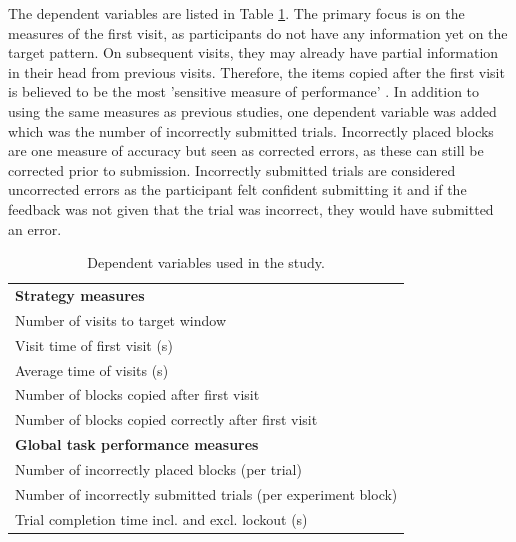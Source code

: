 \documentclass[11pt,oneside]{report}
\begin{document}
The dependent variables are listed in Table \ref{table:ch4_dvs}. The primary focus is on the measures of the first visit, as participants do not have any information yet on the target pattern. On subsequent visits, they may already have partial information in their head from previous visits. Therefore, the items copied after the first visit is believed to be the most 'sensitive measure of performance' \citep{Janssen2012}. 
In addition to using the same measures as previous studies, one dependent variable was added which was the number of incorrectly submitted trials. Incorrectly placed blocks are one measure of accuracy but seen as corrected errors, as these can still be corrected prior to submission. Incorrectly submitted trials are considered uncorrected errors as the participant felt confident submitting it and if the feedback was not given that the trial was incorrect, they would have submitted an error. 

\begin{table}[htp]
\centering
    \begin{tabular}{  l }
    \hline
    \textbf{ Strategy measures} \\  
    Number of visits to target window  \\ 
    Visit time of first visit (s)  \\
    Average time of visits (s) \\
    Number of blocks copied after first visit \\
    Number of blocks copied correctly after first visit 
    
    \vspace{10pt} \\
    
\textbf{Global task performance measures} \\ 
Number of incorrectly placed blocks (per trial) \\
Number of incorrectly submitted trials (per experiment block) \\
Trial completion time incl. and excl. lockout (s) \\ \hline
    \end{tabular}
    \caption{Dependent variables used in the study.}
    \label{table:ch4_dvs}
\end{table}
\end{document}
